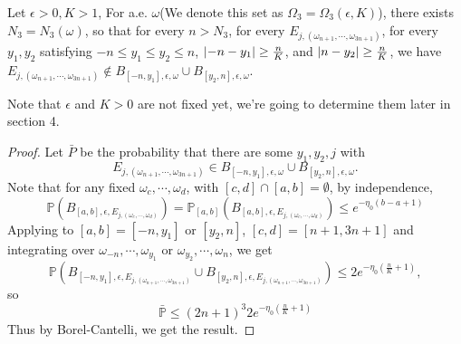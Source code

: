 \begin{lemma}\label{omega3}
   Let $\epsilon>0,K>1$, For a.e. $\omega$(We denote this set as $\Omega_3=\Omega_3(\epsilon,K)$), there exists $ N_3=N_3(\omega)$, so that for every $ n>N_3$, for every $ E_{j,(\omega_{n+1},\cdots,\omega_{3n+1})}$, for every $ y_1,y_2$ satisfying $-n\leq y_1\leq y_2\leq n$,  $\lvert-n-y_1\rvert\geq\frac{n}{K}$, and $\lvert n-y_2\rvert\geq\frac{n}{K}$,
 we have $E_{j,(\omega_{n+1},\cdots,\omega_{3n+1})}\notin B_{[-n,y_1],\epsilon,\omega}\cup B_{[y_2,n],\epsilon,\omega}$.
\end{lemma}
\begin{remark}
  Note that $\epsilon$ and $K>0$ are not fixed yet, we're going to determine them later in section 4.
\end{remark}
\begin{proof}
Let $\bar{P}$
be the probability that there are some $y_1, y_2, j$ with \[
E_{j,(\omega_{n+1},\cdots,\omega_{3n+1})}\in B_{[-n,y_1],\epsilon,\omega}\cup B_{[y_2,n],\epsilon,\omega}.
\] Note that for any fixed $\omega_c,\cdots,\omega_d $, with $[c,d]\cap[a,b]=\emptyset$, by independence,
\[
\mathbb{P}(B_{[a,b],\epsilon,E_{j,(\omega_c,\cdots,\omega_d)}})=\mathbb{P}_{[a,b]}(B_{[a,b],\epsilon,E_{j,(\omega_c,\cdots,\omega_d)}})\leq e^{-\eta_0(b-a+1)}
\]
Applying to $[a,b]=[-n,y_1]$ or $[y_2,n]$, $[c,d]=[n+1,3n+1]$ and integrating over $\omega_{-n},\cdots,\omega_{y_1}$ or $\omega_{y_2},\cdots,\omega_{n}$, we get
\[
\mathbb{P}(B_{[-n,y_1],\epsilon,E_{j,(\omega_{n+1},\cdots,\omega_{3n+1})}}\cup B_{[y_2,n],\epsilon,E_{j,(\omega_{n+1},\cdots,\omega_{3n+1})}}) \leq 2e^{-\eta_0(\frac{n}{K}+1)},
\]
so
\begin{equation}\label{B5}
\bar{\mathbb{P}}\leq(2n+1)^3 2e^{-\eta_0(\frac{n}{K}+1)}
\end{equation}
Thus by Borel-Cantelli, we get the result.


\end{proof}
